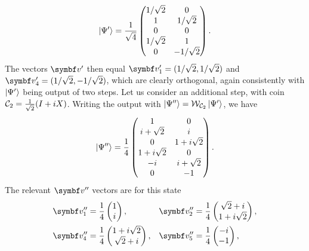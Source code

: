 \begin{example}[label=ex:qw_conditions_few_steps]
\begin{equation}
        \ket{\Psi'} =
        \frac{1}{\sqrt4}
        \begin{pmatrix}
            1/\sqrt2 & 0 \\
            1 & 1/\sqrt2 \\ 
            0 & 0 \\
            1/\sqrt2 & 1 \\
            0 & -1/\sqrt2
        \end{pmatrix}.
        \label{eq:qw_example_psi'}
    \end{equation}
    The vectors $\bs v'$ then equal $\bs v'_1=(1/\sqrt2, 1/\sqrt2)$ and
    $\bs v'_4=(1/\sqrt2, -1/\sqrt2)$,
    which are clearly orthogonal, again consistently with $\ket{\Psi'}$ being output of two steps.
    Let us consider an additional step, with coin ${\mathcal{C}}_2=\frac{1}{\sqrt2}(I + iX)$.
    Writing the output with $\ket{\Psi''}={\mathcal{W}}_{{\mathcal{C}}_2}\ket{\Psi'}$, we have
    \begin{equation}
        \ket{\Psi''} = \frac{1}{4}
        \begin{pmatrix}
            1 & 0 \\
            i + \sqrt2 & i \\
            0 & 1 + i\sqrt2 \\
            1 + i\sqrt2 & 0 \\
            -i & i + \sqrt2 \\
            0 & -1
        \end{pmatrix}.
    \end{equation}
    The relevant $\bs v''$ vectors are for this state
    \begin{equation}
    \begin{aligned}
        &\bs v''_1 = \frac{1}{4}\begin{pmatrix} 1 \\ i \end{pmatrix},
        &&\bs v''_2 = \frac{1}{4}\begin{pmatrix} \sqrt2 + i \\ 1 + i\sqrt2 \end{pmatrix}, \\
        &\bs v''_4 = \frac{1}{4}\begin{pmatrix} 1 + i\sqrt2\\ \sqrt2 + i \end{pmatrix},
        &&\bs v''_5 = \frac{1}{4}\begin{pmatrix} -i \\ -1 \end{pmatrix},
    \end{aligned}

\end{equation}
\end{example}
